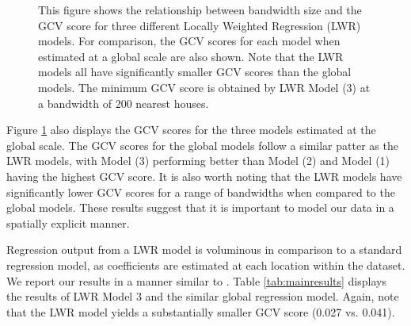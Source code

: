 \documentclass{article}\usepackage{graphicx, color}
\begin{document}
\begin{figure}
\caption{This figure shows the relationship between bandwidth size and the GCV score for three different Locally Weighted Regression (LWR) models. For comparison, the GCV scores for each model when estimated at a global scale are also shown. Note that the LWR models all have significantly smaller GCV scores than the global models. The minimum GCV score is obtained by LWR Model (3) at a bandwidth of 200 nearest houses.}\label{fig:GCVmodel}
\end{figure}

Figure \ref{fig:GCVmodel} also displays the GCV scores for the three models estimated at the global scale. The GCV scores for the global models follow a similar patter as the LWR models, with Model (3) performing better than Model (2) and Model (1) having the highest GCV score. It is also worth noting that the LWR models have significantly lower GCV scores for a range of bandwidths when compared to the global models. These results suggest that it is important to model our data in a spatially explicit manner.


Regression output from a LWR model is voluminous in comparison to a standard regression model, as coefficients are estimated at each location within the dataset. We report our results in a manner similar to \citet{MarmolejoDuarteCarlos;GonzalezTamez2009}. Table \ref{tab:mainresults} displays the results of LWR Model 3 and the similar global regression model. Again, note that the LWR model yields a substantially smaller GCV score (0.027 vs. 0.041).
\end{document}
